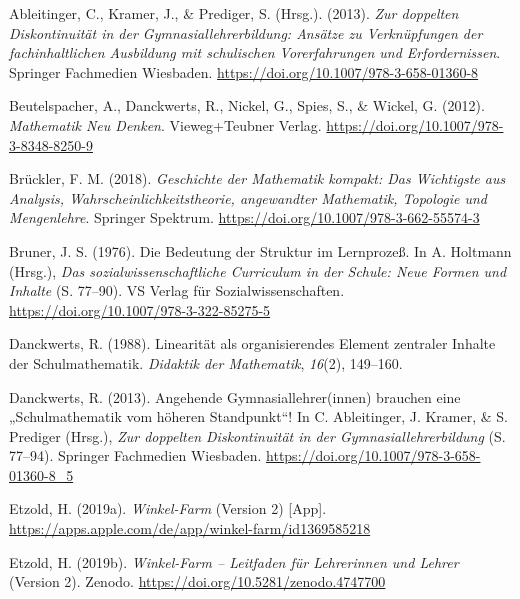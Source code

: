 \documentclass[
]{scrbook}
\newlength{\cslhangindent}
\newenvironment{CSLReferences}[2] %
 {\begin{list}{}{%
  \setlength{\itemindent}{0pt}
  \setlength{\leftmargin}{0pt}
  \setlength{\parsep}{0pt}
  \ifodd #1
   \setlength{\leftmargin}{\cslhangindent}
   \setlength{\itemindent}{-1\cslhangindent}
  \fi
  \setlength{\itemsep}{#2\baselineskip}}}
 {\end{list}}
\theoremstyle{definition}
\theoremstyle{definition}
\theoremstyle{definition}
\theoremstyle{definition}
\theoremstyle{remark}
\begin{document}
\label{refs}
\begin{CSLReferences}{1}{0}
Ableitinger, C., Kramer, J., \& Prediger, S. (Hrsg.). (2013). \emph{Zur doppelten {Diskontinuität} in der {Gymnasiallehrerbildung}: {Ansätze} zu {Verknüpfungen} der fachinhaltlichen {Ausbildung} mit schulischen {Vorerfahrungen} und {Erfordernissen}}. Springer Fachmedien Wiesbaden. \url{https://doi.org/10.1007/978-3-658-01360-8}

Beutelspacher, A., Danckwerts, R., Nickel, G., Spies, S., \& Wickel, G. (2012). \emph{Mathematik {Neu} {Denken}}. Vieweg+Teubner Verlag. \url{https://doi.org/10.1007/978-3-8348-8250-9}

Brückler, F. M. (2018). \emph{Geschichte der {Mathematik} kompakt: {Das} {Wichtigste} aus {Analysis}, {Wahrscheinlichkeitstheorie}, angewandter {Mathematik}, {Topologie} und {Mengenlehre}}. Springer Spektrum. \url{https://doi.org/10.1007/978-3-662-55574-3}

Bruner, J. S. (1976). Die {Bedeutung} der {Struktur} im {Lernprozeß}. In A. Holtmann (Hrsg.), \emph{Das sozialwissenschaftliche {Curriculum} in der {Schule}: {Neue} {Formen} und {Inhalte}} (S. 77--90). VS Verlag für Sozialwissenschaften. \url{https://doi.org/10.1007/978-3-322-85275-5}

Danckwerts, R. (1988). Linearität als organisierendes Element zentraler Inhalte der Schulmathematik. \emph{Didaktik der Mathematik}, \emph{16}(2), 149--160.

Danckwerts, R. (2013). Angehende {Gymnasiallehrer}(innen) brauchen eine „{Schulmathematik} vom höheren {Standpunkt}``! In C. Ableitinger, J. Kramer, \& S. Prediger (Hrsg.), \emph{Zur doppelten {Diskontinuität} in der {Gymnasiallehrerbildung}} (S. 77--94). Springer Fachmedien Wiesbaden. \url{https://doi.org/10.1007/978-3-658-01360-8_5}

Etzold, H. (2019a). \emph{Winkel-{Farm}} (Version 2) {[}App{]}. \url{https://apps.apple.com/de/app/winkel-farm/id1369585218}

Etzold, H. (2019b). \emph{Winkel-{Farm} -- {Leitfaden} für {Lehrerinnen} und {Lehrer}} (Version 2). Zenodo. \url{https://doi.org/10.5281/zenodo.4747700}


\end{CSLReferences}
\end{document}

